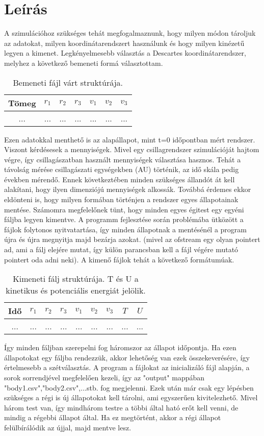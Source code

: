 \section{Leírás}

A szimulációhoz szükséges tehát megfogalmaznunk, hogy milyen módon tároljuk az adatokat, milyen koordinátarendszert használunk és hogy milyen kinézetű legyen a kimenet. Legkényelmesebb választás a Descartes koordinátarendszer, melyhez a következő bemeneti formá választottam.

\begin{table}[ht!]
    \centering
    \begin{tabular}{|c|c|c|c|c|c|c|}  \hline 
        Tömeg & $r_1$ & $r_2$ & $r_3$ & $v_1$ & $v_2$ & $v_3$  \\ \hline 
        ... & ... & ... & ... & ... & ... & ... \\  
    \end{tabular}
    \caption{Bemeneti fájl várt struktúrája.}
    \label{tab:input}
\end{table}
Ezen adatokkal menthető is az alapállapot, mint t=0 időpontban mért rendszer. Viszont kérdésesek a mennyiségek. Mivel egy csillagrendszer szimulációját hajtom végre, így csillagászatban használt mennyiségek választása hasznos. Tehát a távolság mérése csillagászati egységekben (AU) történik, az idő skála pedig években mérendő. Ennek következtében minden szükséges állandót át kell alakítani, hogy ilyen dimenziójú mennyiségek alkossák. 
Továbbá érdemes ekkor eldönteni is, hogy milyen formában történjen a rendszer egyes állapotainak mentése. Számomra megfelelőnek tünt, hogy minden egyes égitest egy egyéni fáljba legyen kimentve. A programm fejlesztése során problémába ütközött a fájlok folytonos nyitvatartása, így minden állapotnak a mentésénél a program újra és újra megnyitja majd bezárja azokat. (mivel az ofstream egy olyan pointert ad, ami a fálj elejére mutat, így külön parancsban kell a fájl végére mutató pointert oda adni neki). A kimenő fájlok tehát a következő formátumúak.
\begin{table}[ht!]
    \centering
    \begin{tabular}{|c|c|c|c|c|c|c|c|c|}  \hline 
        Idő & $r_1$ & $r_2$ & $r_3$ & $v_1$ & $v_2$ & $v_3$ & $T$ & $U$  \\ \hline 
        ... & ... & ... & ... & ... & ... & ...& ... & ... \\  
    \end{tabular}
    \caption{Kimeneti fálj struktúrája. T és U a kinetikus és potenciális energiát jelölik.}
    \label{tab:output}
\end{table}
Így minden fáljban szerepelni fog háromszor az állapot időpontja. Ha ezen állapotokat egy fáljba rendezzük, akkor lehetőség van ezek összekeverésére, így értelmesebb a szétválasztás. A program a fájlokat az inicializáló fájl alapján, a sorok sorrendjével megfelelően kezeli, így az "output" mappában "body1.csv","body2.csv",...stb. fog megjelenni.
Ezek után már csak egy lépésben szükséges a régi is új állapotokat kell tárolni, ami egyszerűen kivitelezhető. Mivel három test van, így mindhárom testre a többi által ható erőt kell venni, de mindig a régebbi állapot által. Ha ez megtörtént, akkor a régi állapot felülbírálódik az újjal, majd mentve lesz.